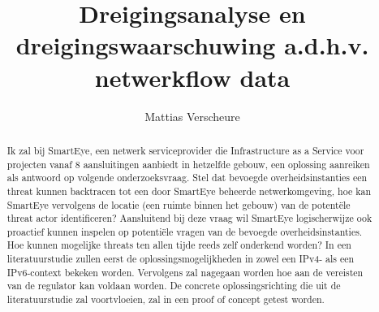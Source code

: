 \documentclass{hogent-article}
\title{Dreigingsanalyse en dreigingswaarschuwing a.d.h.v. netwerkflow data}
\author{Mattias Verscheure}
\begin{document}
\begin{abstract}
    Ik zal bij SmartEye, een netwerk serviceprovider die Infrastructure as a Service voor projecten vanaf 8 aansluitingen aanbiedt in hetzelfde gebouw, een oplossing aanreiken als antwoord op volgende onderzoeksvraag. Stel dat bevoegde overheidsinstanties een threat kunnen backtracen tot een door SmartEye beheerde netwerkomgeving, hoe kan SmartEye vervolgens de locatie (een ruimte binnen het gebouw) van de potentële threat actor identificeren? Aansluitend bij deze vraag wil SmartEye logischerwijze ook proactief kunnen inspelen op potentiële vragen van de bevoegde overheidsinstanties. Hoe kunnen mogelijke threats ten allen tijde reeds zelf onderkend worden? In een literatuurstudie zullen eerst de oplossingsmogelijkheden in zowel een IPv4- als een IPv6-context bekeken worden. Vervolgens zal nagegaan worden hoe aan de vereisten van de regulator kan voldaan worden. De concrete oplossingsrichting die uit de literatuurstudie zal voortvloeien, zal in een proof of concept getest worden.
\end{abstract}

\tableofcontents



\printbibliography[heading=bibintoc]
\end{document}
